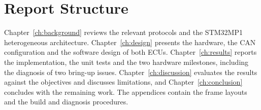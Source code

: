 \section{Report Structure}

Chapter~\ref{ch:background} reviews the relevant protocols and the STM32MP1 heterogeneous architecture. Chapter~\ref{ch:design} presents the hardware, the CAN configuration and the software design of both ECUs. Chapter~\ref{ch:results} reports the implementation, the unit tests and the two hardware milestones, including the diagnosis of two bring-up issues. Chapter~\ref{ch:discussion} evaluates the results against the objectives and discusses limitations, and Chapter~\ref{ch:conclusion} concludes with the remaining work. The appendices contain the frame layouts and the build and diagnosis procedures.
